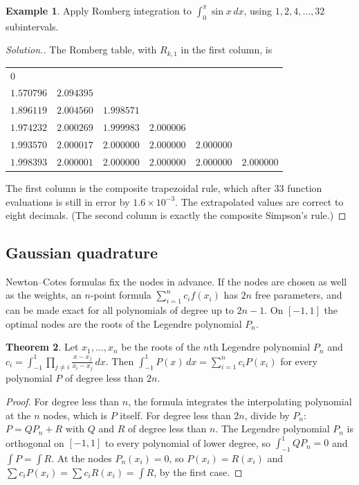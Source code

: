 \documentclass[11pt,a4paper]{article}
\numberwithin{equation}{section}
\theoremstyle{definition}
\newtheorem{thm}{Theorem}[subsection]
\newtheorem{exa}[thm]{Example}
\newenvironment{solution}
  {\renewcommand{\qedsymbol}{}\begin{proof}[\textit{Solution}.]}
  {\end{proof}}
\begin{document}
\begin{exa}
\label{exa:romberg}
Apply Romberg integration to $\int_0^\pi\sin x\,dx$, using $1, 2, 4, \dots, 32$ subintervals.
\end{exa}

\begin{solution}
The Romberg table, with $R_{k,1}$ in the first column, is
\begin{center}
\begin{tabular}{llllll}
\hline
$0$ & & & & & \\
$1.570796$ & $2.094395$ & & & & \\
$1.896119$ & $2.004560$ & $1.998571$ & & & \\
$1.974232$ & $2.000269$ & $1.999983$ & $2.000006$ & & \\
$1.993570$ & $2.000017$ & $2.000000$ & $2.000000$ & $2.000000$ & \\
$1.998393$ & $2.000001$ & $2.000000$ & $2.000000$ & $2.000000$ & $2.000000$\\
\hline
\end{tabular}
\end{center}
The first column is the composite trapezoidal rule, which after $33$ function evaluations is still in error by $1.6\times10^{-3}$. The
extrapolated values are correct to eight decimals. (The second column is exactly the composite Simpson's rule.)
\end{solution}


\subsection{Gaussian quadrature}
\label{sec:gauss}

Newton--Cotes formulas fix the nodes in advance. If the nodes are chosen as well as the weights, an $n$-point formula
$\sum_{i=1}^nc_if(x_i)$ has $2n$ free parameters, and can be made exact for all polynomials of degree up to $2n-1$. On $[-1,1]$ the optimal
nodes are the roots of the Legendre polynomial $P_n$.

\begin{thm}
\label{thm:gaussquad}
Let $x_1,\dots,x_n$ be the roots of the $n$th Legendre polynomial $P_n$ and $c_i = \int_{-1}^1\prod_{j\neq i}\frac{x-x_j}{x_i-x_j}\,dx$. Then
$\int_{-1}^1P(x)\,dx = \sum_{i=1}^nc_iP(x_i)$ for every polynomial $P$ of degree less than $2n$.
\end{thm}

\begin{proof}
For degree less than $n$, the formula integrates the interpolating polynomial at the $n$ nodes, which is $P$ itself. For degree less than
$2n$, divide by $P_n$: $P = QP_n+R$ with $Q$ and $R$ of degree less than $n$. The Legendre polynomial $P_n$ is orthogonal on $[-1,1]$ to every
polynomial of lower degree, so $\int_{-1}^1QP_n = 0$ and $\int P = \int R$. At the nodes $P_n(x_i) = 0$, so $P(x_i) = R(x_i)$ and
$\sum c_iP(x_i) = \sum c_iR(x_i) = \int R$, by the first case.
\end{proof}
\end{document}
